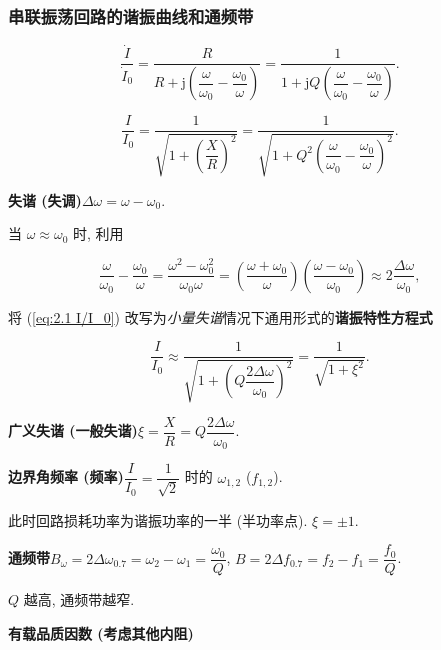 \subsubsection{串联振荡回路的谐振曲线和通频带} \label{串联振荡回路的谐振曲线和通频带}

\begin{equation}
    \frac{\dot{I}}{\dot{I}_0}=\frac{R}{R+\mathrm{j}\left(\dfrac{\omega}{\omega_0}-\dfrac{\omega_0}{\omega}\right)}=\frac{1}{1+\mathrm{j}Q\left(\dfrac{\omega}{\omega_0}-\dfrac{\omega_0}{\omega}\right)}.
\end{equation}

\begin{equation} \label{eq:2.1 I/I_0}
    \frac{I}{I_0}=\frac{1}{\sqrt{1+\left(\dfrac{X}{R}\right)^2}}=\frac{1}{\sqrt{1+Q^2\left(\dfrac{\omega}{\omega_0}-\dfrac{\omega_0}{\omega}\right)^2}}.
\end{equation}

\textbf{失谐 (失调)}\quad $\Delta\omega=\omega-\omega_0$.

当 $\omega\approx\omega_0$ 时, 利用

\begin{equation*}
    \frac{\omega}{\omega_0}-\frac{\omega_0}{\omega}=\frac{\omega^2-\omega_0^2}{\omega_0\omega}=\left(\frac{\omega+\omega_0}{\omega}\right)\left(\frac{\omega-\omega_0}{\omega_0}\right)\approx 2\frac{\Delta\omega}{\omega_0},
\end{equation*}

\noindent 将 (\ref{eq:2.1 I/I_0}) 改写为\textit{小量失谐}情况下通用形式的\textbf{谐振特性方程式}

\begin{equation} \label{eq:2.1 I/I_0 xi}
    \frac{I}{I_0}\approx\frac{1}{\sqrt{1+\left(Q\dfrac{2\Delta\omega}{\omega_0}\right)^2}}=\frac{1}{\sqrt{1+\xi^2}}.
\end{equation}

\textbf{广义失谐 (一般失谐)}\quad $\xi=\dfrac{X}{R}=Q\dfrac{2\Delta\omega}{\omega_0}$.

\textbf{边界角频率 (频率)}\quad $\dfrac{I}{I_0}=\dfrac{1}{\sqrt{2}}$ 时的 $\omega_{1,2}$ ($f_{1,2}$).

此时回路损耗功率为谐振功率的一半 (半功率点). $\xi=\pm 1$.

\textbf{通频带}\quad $B_\omega=2\Delta\omega_{0.7}=\omega_2-\omega_1=\dfrac{\omega_0}{Q}$, $B=2\Delta f_{0.7}=f_2-f_1=\dfrac{f_0}{Q}$.

$Q$ 越高, 通频带越窄.

\textbf{有载品质因数 (考虑其他内阻)}

